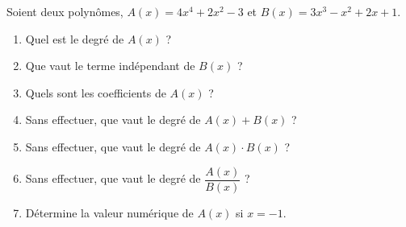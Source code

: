 %
%
    Soient deux polynômes,
    \(A(x) = 4x^4 + 2x^2 - 3\) et \(B(x) = 3x^3 - x^2 + 2x + 1\).
    \begin{enumerate}
        \item Quel est le degré de \(A(x)\) ?
        \item Que vaut le terme indépendant de \(B(x)\) ?
        \item Quels sont les coefficients de \(A(x)\) ?
        \item Sans effectuer, que vaut le degré de \(A(x) + B(x)\) ?
        \item Sans effectuer, que vaut le degré de \(A(x) \cdot B(x)\) ?
        \item Sans effectuer, que vaut le degré de \(\dfrac{A(x)}{B(x)}\) ?
        \item Détermine la valeur numérique de \(A(x)\) si \(x=-1\).
    \end{enumerate}
